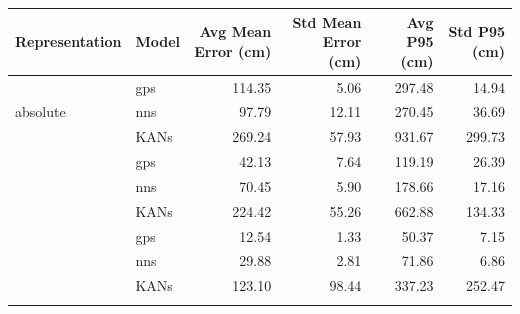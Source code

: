 
\begin{tabular}{llrrrr}
\toprule
Representation & Model & Avg Mean Error (cm) & Std Mean Error (cm) & Avg P95 (cm) & Std P95 (cm) \\
\midrule

\multirow{3}{*}{absolute} & gps & 114.35 & 5.06 & 297.48 & 14.94 \\
 & nns & 97.79 & 12.11 & 270.45 & 36.69 \\
 & KANs & 269.24 & 57.93 & 931.67 & 299.73 \\
\addlinespace
\multirow{3}{*}{relative} & gps & 42.13 & 7.64 & 119.19 & 26.39 \\
 & nns & 70.45 & 5.90 & 178.66 & 17.16 \\
 & KANs & 224.42 & 55.26 & 662.88 & 134.33 \\
\addlinespace
\multirow{3}{*}{log_d} & gps & 12.54 & 1.33 & 50.37 & 7.15 \\
 & nns & 29.88 & 2.81 & 71.86 & 6.86 \\
 & KANs & 123.10 & 98.44 & 337.23 & 252.47 \\
\addlinespace

\bottomrule
\end{tabular}
